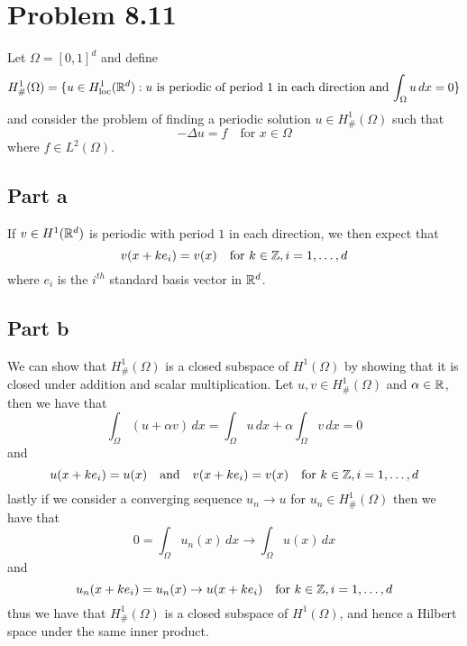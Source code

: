 \documentclass[12pt]{report}
\begin{document}
\section*{Problem 8.11}
Let $\Omega = [0,1]^d$ and define
\begin{equation*}
H_{\#}^1(\Omega) = \{ u \in H^1_{\text{loc}}(\mathbb{R}^d) : \text{$u$ is periodic of period $1$ in each direction and $\int_{\Omega} u \, dx = 0$} \}
\end{equation*}
and consider the problem of finding a periodic solution $u \in H^1_{\#}(\Omega)$ such that
\begin{equation*}
  -\Delta u = f \quad \text{for } x \in \Omega
\end{equation*}
where $f \in L^2(\Omega)$.

\subsection*{Part a}
If $v \in H^1(\mathbb{R}^d)$ is periodic with period $1$ in each direction, we then expect that
\begin{equation*}
v(x + ke_i) = v(x) \quad \text{for } k \in \mathbb{Z}, i = 1,\ldots,d
\end{equation*}
where $e_i$ is the $i^{th}$ standard basis vector in $\mathbb{R}^d$. 

\subsection*{Part b}
We can show that $H_{\#}^1(\Omega)$ is a closed subspace of $H^1(\Omega)$ by showing that it is closed under addition and scalar multiplication. Let $u,v \in H_{\#}^1(\Omega)$ and $\alpha \in \mathbb{R}$, then we have that 
\begin{equation*}
  \int_{\Omega} (u + \alpha v) \, dx = \int_{\Omega} u \, dx + \alpha \int_{\Omega} v \, dx = 0
\end{equation*}
and
\begin{equation*}
  u(x + ke_i) = u(x) \quad \text{and} \quad v(x + ke_i) = v(x) \quad \text{for } k \in \mathbb{Z}, i = 1,\ldots,d
\end{equation*}
lastly if we consider a converging sequence $u_n \to u$ for $u_n \in H_{\#}^1(\Omega)$ then we have that
\begin{equation*}
  0 = \int_{\Omega} u_n(x) \, dx \to \int_{\Omega} u(x) \, dx
\end{equation*}
and
\begin{equation*}
  u_n(x + ke_i) = u_n(x) \to u(x + ke_i) \quad \text{for } k \in \mathbb{Z}, i = 1,\ldots,d
\end{equation*}
thus we have that $H_{\#}^1(\Omega)$ is a closed subspace of $H^1(\Omega)$, and hence a Hilbert space under the same inner product.
\end{document}
